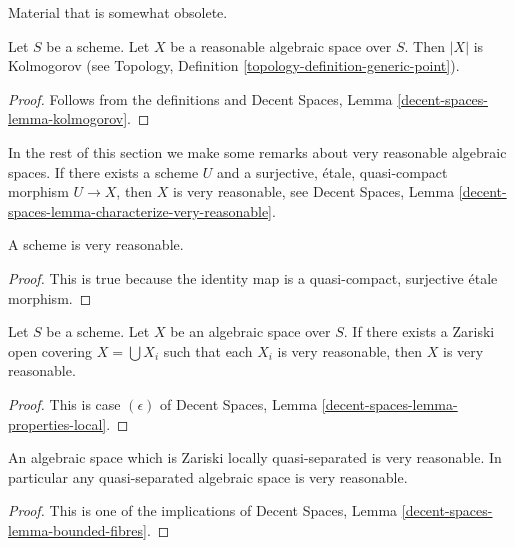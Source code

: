 \noindent
Material that is somewhat obsolete.

\begin{lemma}
\label{lemma-reasonable-kolmogorov}
Let $S$ be a scheme.
Let $X$ be a reasonable algebraic space over $S$.
Then $|X|$ is Kolmogorov (see
Topology, Definition \ref{topology-definition-generic-point}).
\end{lemma}

\begin{proof}
Follows from the definitions and
Decent Spaces, Lemma \ref{decent-spaces-lemma-kolmogorov}.
\end{proof}

\noindent
In the rest of this section we make some remarks about very reasonable
algebraic spaces. If there exists a scheme $U$ and a
surjective, \'etale, quasi-compact
morphism $U \to X$, then $X$ is very reasonable, see
Decent Spaces, Lemma \ref{decent-spaces-lemma-characterize-very-reasonable}.

\begin{lemma}
\label{lemma-scheme-very-reasonable}
A scheme is very reasonable.
\end{lemma}

\begin{proof}
This is true because the identity map is a quasi-compact, surjective
\'etale morphism.
\end{proof}

\begin{lemma}
\label{lemma-very-reasonable-Zariski-local}
Let $S$ be a scheme.
Let $X$ be an algebraic space over $S$.
If there exists a Zariski open covering $X = \bigcup X_i$ such that
each $X_i$ is very reasonable, then $X$ is very reasonable.
\end{lemma}

\begin{proof}
This is case $(\epsilon)$ of
Decent Spaces, Lemma \ref{decent-spaces-lemma-properties-local}.
\end{proof}

\begin{lemma}
\label{lemma-quasi-separated-very-reasonable}
An algebraic space which is Zariski locally quasi-separated is very reasonable.
In particular any quasi-separated algebraic space is very reasonable.
\end{lemma}

\begin{proof}
This is one of the implications of
Decent Spaces, Lemma \ref{decent-spaces-lemma-bounded-fibres}.
\end{proof}

